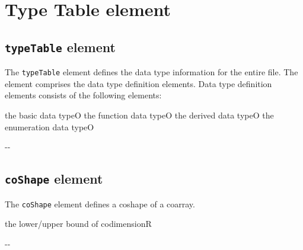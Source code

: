 \section{Type Table element}

\subsection{ {\tt typeTable} element}

The {\tt typeTable} element defines the data type information for the entire file. The element comprises the data type definition elements. Data type definition elements consists of the following elements:


\begin{XcodeMLChildElements}
{the basic data type}{O}
{the function data type}{O}
{the derived data type}{O}
{the enumeration data type}{O}
\end{XcodeMLChildElements}

\begin{XcodeMLAttributes}
\XcodeMLAttrDef{-}{-}
{-}{-}
\end{XcodeMLAttributes}


\subsection{ {\tt coShape} element}

The {\tt coShape} element defines a coshape of a coarray.


\begin{XcodeMLChildElements}
{the lower/upper bound of codimension}{R}
\end{XcodeMLChildElements}

\begin{XcodeMLAttributes}
\XcodeMLAttrDef{-}{-}
{-}{-}
\end{XcodeMLAttributes}


